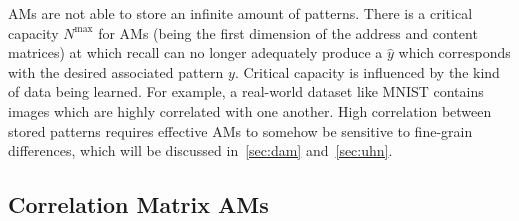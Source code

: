 \documentclass{article}
\theoremstyle{definition}
\begin{document}
AMs are not able to store an infinite amount of patterns. There is a critical
capacity $N^\text{max}$ for AMs
(being the first dimension of the address and content matrices) at which 
recall can no longer adequately produce a $\hat y$ which corresponds with 
the desired associated pattern $y$. Critical capacity is
influenced by the kind of data being learned. For example, a real-world
dataset like MNIST \parencite{lecun_mnist_2010} contains images which are
highly correlated with one another. High correlation between stored patterns
requires effective AMs to somehow be sensitive to fine-grain differences, which
will be discussed in~\autoref{sec:dam} and~\autoref{sec:uhn}.

\subsection{Correlation Matrix AMs}\label{sec:correl}
\end{document}
